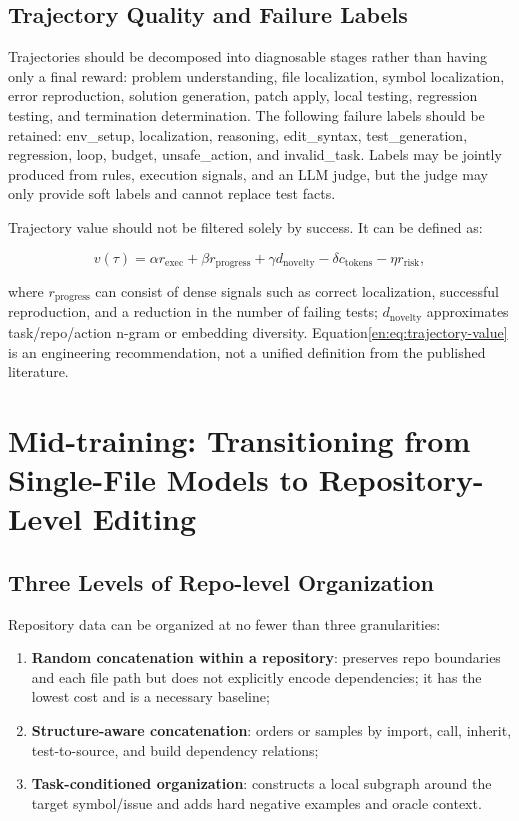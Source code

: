 \documentclass[10pt,a4paper,UTF8,fontset=none]{ctexart}
\newcommand{\ident}[1]{{\rmfamily #1}}
\begin{document}
\subsection{Trajectory Quality and Failure Labels}

Trajectories should be decomposed into diagnosable stages rather than having only a final reward: problem understanding, file localization, symbol localization, error reproduction, solution generation, patch apply, local testing, regression testing, and termination determination. The following failure labels should be retained: \ident{env\_setup}, \ident{localization}, \ident{reasoning}, \ident{edit\_syntax}, \ident{test\_generation}, \ident{regression}, \ident{loop}, \ident{budget}, \ident{unsafe\_action}, and \ident{invalid\_task}. Labels may be jointly produced from rules, execution signals, and an LLM judge, but the judge may only provide soft labels and cannot replace test facts.

Trajectory value should not be filtered solely by success. It can be defined as:

\begin{equation}
v(\tau)=\alpha r_{\mathrm{exec}}+\beta r_{\mathrm{progress}}+\gamma d_{\mathrm{novelty}}-\delta c_{\mathrm{tokens}}-\eta r_{\mathrm{risk}},
\label{en:eq:trajectory-value}
\end{equation}

where $r_{\mathrm{progress}}$ can consist of dense signals such as correct localization, successful reproduction, and a reduction in the number of failing tests; $d_{\mathrm{novelty}}$ approximates task/repo/action n-gram or embedding diversity. Equation\eqref{en:eq:trajectory-value} is an engineering recommendation, not a unified definition from the published literature.

\section{Mid-training: Transitioning from Single-File Models to Repository-Level Editing}

\subsection{Three Levels of Repo-level Organization}

Repository data can be organized at no fewer than three granularities:

\begin{enumerate}
  \item \textbf{Random concatenation within a repository}: preserves repo boundaries and each file path but does not explicitly encode dependencies; it has the lowest cost and is a necessary baseline;
  \item \textbf{Structure-aware concatenation}: orders or samples by import, call, inherit, test-to-source, and build dependency relations;
  \item \textbf{Task-conditioned organization}: constructs a local subgraph around the target symbol/issue and adds hard negative examples and oracle context.
\end{enumerate}
\end{document}
